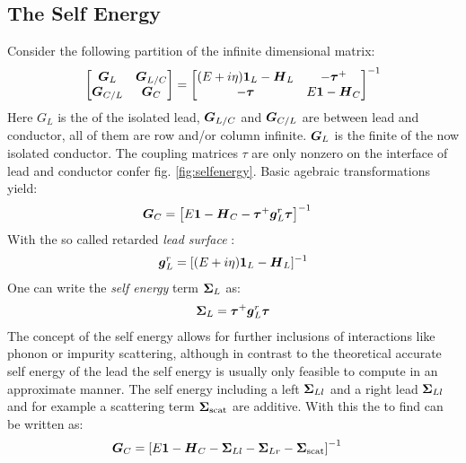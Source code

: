 \subsection{The Self Energy}
Consider the following partition of the infinite dimensional \gfnc{} matrix:
\begin{align}
  \begin{bmatrix}
  \boldsymbol{G}_{L} & \boldsymbol{G}_{L/C}\\
  \boldsymbol{G}_{C/L} & \boldsymbol{G}_{C}
  \end{bmatrix}
  =
  \begin{bmatrix}
  (E+i\eta)\boldsymbol{1}_{L} - \boldsymbol{H}_L  & -\boldsymbol{\tau}^+ \\
	-\boldsymbol{\tau} & E\boldsymbol{1} - \boldsymbol{H}_C
  \end{bmatrix}^{-1}
  \label{eqn:greendivided}
\end{align}
Here $G_L$ is the \gfnc{} of the isolated lead, $\boldsymbol{G}_{L/C}$ and $\boldsymbol{G}_{C/L}$ are \gfnc{} between lead and conductor, all of them are row and/or column infinite. $\boldsymbol{G}_L$ is the finite \gfnc{} of the now isolated conductor. The coupling matrices $\tau$ are only nonzero on the interface of lead and conductor confer fig. \ref{fig:selfenergy}.
Basic agebraic transformations yield\cite{Datta1997}:
\begin{align}
\boldsymbol{G}_C& = \left[E\boldsymbol{1}-\boldsymbol{H}_C -\boldsymbol{\tau}^+ \boldsymbol{g}_L^r \boldsymbol{\tau} \right]^{-1} 
\label{eqn:finitegreensfunction}
\end{align}
With the so called retarded \emph{lead surface \gfnc{}}:
\begin{align}
\boldsymbol{g}_L^r = [(E+i\eta)\boldsymbol{1}_L - \boldsymbol{H}_L]^{-1}
\label{eqn:leadsurfacegfnc}
\end{align}
One can write the \emph{self energy} term $\boldsymbol{\Sigma}_L$ as:
\begin{align}
\boldsymbol{\Sigma}_L = \boldsymbol{\tau}^+ \boldsymbol{g}_L^r \boldsymbol{\tau}
\end{align}
The concept of the self energy allows for further inclusions of interactions like phonon or impurity scattering, although in contrast to the theoretical accurate self energy of the lead the self energy is usually only feasible to compute in an approximate manner. The self energy including a left $\boldsymbol{\Sigma}_{Ll}$ and a right lead $\boldsymbol{\Sigma}_{Ll}$ and for example a scattering term $\boldsymbol{\Sigma}_{\text{scat}}$ are additive. With this the \gfnc{} to find can be written as:
\begin{align}
\boldsymbol{G}_C& = \left[E\boldsymbol{1}-\boldsymbol{H}_C -\boldsymbol{\Sigma}_{Ll}-\boldsymbol{\Sigma}_{Lr}-\boldsymbol{\Sigma}_{\text{scat}} \right]^{-1} 
\label{eqn:finitegreensfunctionwithselfenergy}
\end{align}
